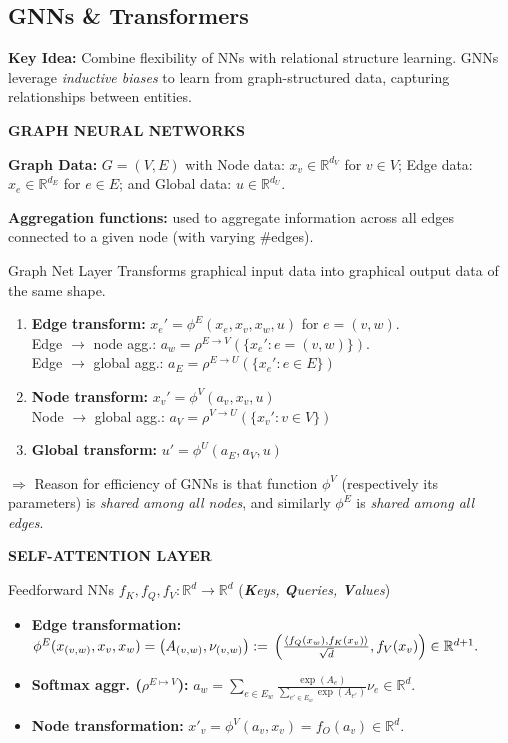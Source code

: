 \documentclass[a4paper,10pt]{article}
\newcommand{\subtitle}[1]{\vspace{0.25cm}\begin{normalsize}\textbf{\textcolor{gray!150}{\uppercase{#1}}}\end{normalsize}}
\begin{document}
\begin{small}
\section{GNNs \& Transformers}

\textbf{Key Idea:} Combine flexibility of NNs with relational structure learning. GNNs leverage \textit{inductive biases} to learn from graph-structured data, capturing relationships between entities.

\subtitle{Graph Neural Networks}

\textbf{Graph Data:} $G=(V,E)$ with Node data: $x_v \in \mathbb{R}^{d_V}$ for $v \in V$; Edge data: $x_e \in \mathbb{R}^{d_E}$ for $e \in E$; and Global data: $u \in \mathbb{R}^{d_U}$.

\textbf{Aggregation functions:} used to aggregate information across all edges
connected to a given node (with varying \#edges).

\begin{subbox}{Graph Net Layer}
    Transforms graphical input data into graphical output data of the same shape.
\begin{enumerate}
    \item \textbf{Edge transform:} $x_e' = \phi^E(x_e, x_v, x_w, u)$ for $e=(v,w)$. \\
    Edge $\rightarrow$ node agg.: $a_w = \rho^{E\to V}(\{x_e': e=(v,w)\})$. \\
    Edge $\rightarrow$ global agg.: $a_E = \rho^{E\to U}(\{x_e': e \in E\})$
    \item \textbf{Node transform:} $x_v' = \phi^V(a_v, x_v, u)$ \\
    Node $\rightarrow$ global agg.: $a_V = \rho^{V\to U}(\{x_v': v \in V\})$
    \item \textbf{Global transform:} $u' = \phi^U(a_E, a_V, u)$
\end{enumerate}
\end{subbox}

$\Rightarrow$ Reason for efficiency of GNNs is that function $\phi^V$ (respectively its parameters) is \textit{shared among all nodes}, and similarly $\phi^E$ is \textit{shared among all edges}.

\subtitle{Self-Attention Layer}

Feedforward NNs $f_K, f_Q, f_V : \mathbb{R}^d \to \mathbb{R}^d$ (\emph{\textbf{K}eys, \textbf{Q}ueries, \textbf{V}alues})
\begin{scriptsize}
\begin{itemize}
    \item \textbf{Edge transformation:}
    \(
    \phi^E(x_{(v,w)}, x_v, x_w) = \left( A_{(v,w)}, \nu_{(v,w)} \right) := \\ \left( \frac{\langle f_Q(x_w), f_K(x_v) \rangle}{\sqrt{d}}, f_V(x_v) \right) \in \mathbb{R}^{d+1}.
    \)
    \item \textbf{Softmax aggr. ($\rho^{E \mapsto V}$):}
    \(
    a_w = \sum_{e \in E_w} \frac{\exp(A_e)}{\sum_{e' \in E_w} \exp(A_{e'})} \nu_e \in \mathbb{R}^d.
    \)
    \item \textbf{Node transformation:}
    \(
    x'_v = \phi^V(a_v, x_v) = f_O(a_v) \in \mathbb{R}^d.
    \)
\end{itemize}
\end{scriptsize}



\end{small}
\end{document}
